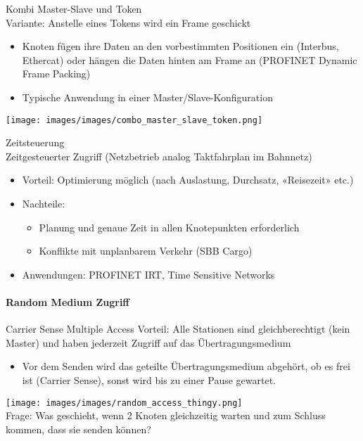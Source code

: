 \begin{concept}{Kombi Master-Slave und Token}\\
    Variante: Anstelle eines Tokens wird ein Frame geschickt
    \begin{itemize}
        \item Knoten fügen ihre Daten an den vorbestimmten Positionen ein (Interbus, Ethercat) oder hängen die Daten hinten am Frame an (PROFINET Dynamic Frame Packing)
        \item Typische Anwendung in einer Master/Slave-Konfiguration
    \end{itemize}
        \texttt{[image: images/images/combo\_master\_slave\_token.png]}
\end{concept}

\begin{definition}{Zeitsteuerung}\\
    Zeitgesteuerter Zugriff (Netzbetrieb analog Taktfahrplan im Bahnnetz)
    \begin{itemize}
        \item Vorteil: Optimierung möglich (nach Auslastung, Durchsatz, «Reisezeit» etc.)
        \item Nachteile:
        \begin{itemize}
            \item Planung und genaue Zeit in allen Knotepunkten erforderlich
            \item Konflikte mit unplanbarem Verkehr (SBB Cargo)
        \end{itemize}
        \item Anwendungen: PROFINET IRT, Time Sensitive Networks
    \end{itemize}
\end{definition}

\paragraph{Random Medium Zugriff}

\begin{definition}{Carrier Sense Multiple Access}
    Vorteil: Alle Stationen sind gleichberechtigt (kein Master) und haben jederzeit Zugriff auf das Übertragungsmedium
    \begin{itemize}
        \item Vor dem Senden wird das geteilte Übertragungsmedium abgehört, ob es frei ist (Carrier Sense), sonst wird bis zu einer Pause gewartet.
    \end{itemize}
        \texttt{[image: images/images/random\_access\_thingy.png]}\\
    Frage: Was geschieht, wenn 2 Knoten gleichzeitig warten und zum Schluss kommen, dass sie senden können?
\end{definition}

